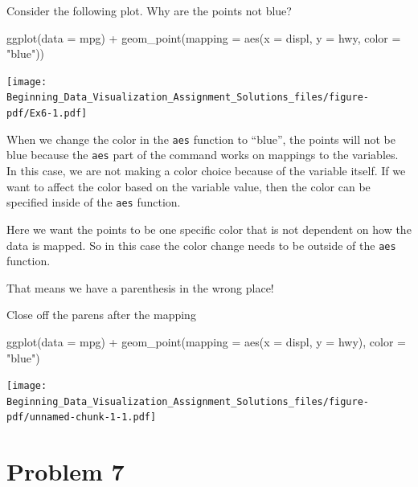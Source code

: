 \documentclass[
  letterpaper,
  DIV=11,
  numbers=noendperiod]{scrreprt}
\newenvironment{Shaded}{\begin{snugshade}}{\end{snugshade}}
\newcommand{\AttributeTok}[1]{\textcolor[rgb]{0.40,0.45,0.13}{#1}}
\newcommand{\FunctionTok}[1]{\textcolor[rgb]{0.28,0.35,0.67}{#1}}
\newcommand{\NormalTok}[1]{\textcolor[rgb]{0.00,0.23,0.31}{#1}}
\newcommand{\SpecialCharTok}[1]{\textcolor[rgb]{0.37,0.37,0.37}{#1}}
\newcommand{\StringTok}[1]{\textcolor[rgb]{0.13,0.47,0.30}{#1}}
\begin{document}

Consider the following plot. Why are the points not blue?

\begin{Shaded}
\begin{Highlighting}[]
 \FunctionTok{ggplot}\NormalTok{(}\AttributeTok{data =}\NormalTok{ mpg) }\SpecialCharTok{+} 
  \FunctionTok{geom\_point}\NormalTok{(}\AttributeTok{mapping =} \FunctionTok{aes}\NormalTok{(}\AttributeTok{x =}\NormalTok{ displ, }\AttributeTok{y =}\NormalTok{ hwy, }\AttributeTok{color =} \StringTok{"blue"}\NormalTok{))}
\end{Highlighting}
\end{Shaded}

\texttt{[image: Beginning\_Data\_Visualization\_Assignment\_Solutions\_files/figure-pdf/Ex6-1.pdf]}

When we change the color in the \texttt{aes} function to ``blue'', the
points will not be blue because the \texttt{aes} part of the command
works on mappings to the variables. In this case, we are not making a
color choice because of the variable itself. If we want to affect the
color based on the variable value, then the color can be specified
inside of the \texttt{aes} function.

Here we want the points to be one specific color that is not dependent
on how the data is mapped. So in this case the color change needs to be
outside of the \texttt{aes} function.

That means we have a parenthesis in the wrong place!

Close off the parens after the mapping

\begin{Shaded}
\begin{Highlighting}[]
\FunctionTok{ggplot}\NormalTok{(}\AttributeTok{data =}\NormalTok{ mpg) }\SpecialCharTok{+} 
  \FunctionTok{geom\_point}\NormalTok{(}\AttributeTok{mapping =} \FunctionTok{aes}\NormalTok{(}\AttributeTok{x =}\NormalTok{ displ, }\AttributeTok{y =}\NormalTok{ hwy), }\AttributeTok{color =} \StringTok{"blue"}\NormalTok{)}
\end{Highlighting}
\end{Shaded}

\texttt{[image: Beginning\_Data\_Visualization\_Assignment\_Solutions\_files/figure-pdf/unnamed-chunk-1-1.pdf]}

\section*{Problem 7}\label{problem-7-3}
\end{document}

